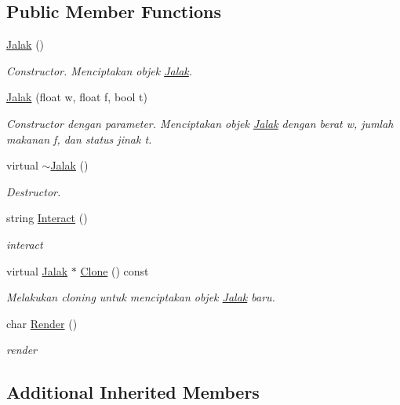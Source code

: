 \subsection*{Public Member Functions}
\begin{DoxyCompactItemize}
\item 
\hyperlink{classJalak_a3887e1118830188e1aeffee215b2816f}{Jalak} ()
\begin{DoxyCompactList}\small\item\em Constructor. Menciptakan objek \hyperlink{classJalak}{Jalak}. \end{DoxyCompactList}\item 
\hyperlink{classJalak_a12f97db5ae28b059a948c7f52f5eb002}{Jalak} (float w, float f, bool t)
\begin{DoxyCompactList}\small\item\em Constructor dengan parameter. Menciptakan objek \hyperlink{classJalak}{Jalak} dengan berat w, jumlah makanan f, dan status jinak t. \end{DoxyCompactList}\item 
virtual \hyperlink{classJalak_a2c1e4e68ab9126c034520c2c845a5afa}{$\sim$\+Jalak} ()
\begin{DoxyCompactList}\small\item\em Destructor. \end{DoxyCompactList}\item 
string \hyperlink{classJalak_a864b931f04f1580759c4a108e1734bb8}{Interact} ()
\begin{DoxyCompactList}\small\item\em interact \end{DoxyCompactList}\item 
virtual \hyperlink{classJalak}{Jalak} $\ast$ \hyperlink{classJalak_a85b145221386cdca75274b4438250161}{Clone} () const 
\begin{DoxyCompactList}\small\item\em Melakukan cloning untuk menciptakan objek \hyperlink{classJalak}{Jalak} baru. \end{DoxyCompactList}\item 
char \hyperlink{classJalak_af500189104401b66d6ab4e3b1106ce74}{Render} ()
\begin{DoxyCompactList}\small\item\em render \end{DoxyCompactList}\end{DoxyCompactItemize}
\subsection*{Additional Inherited Members}


